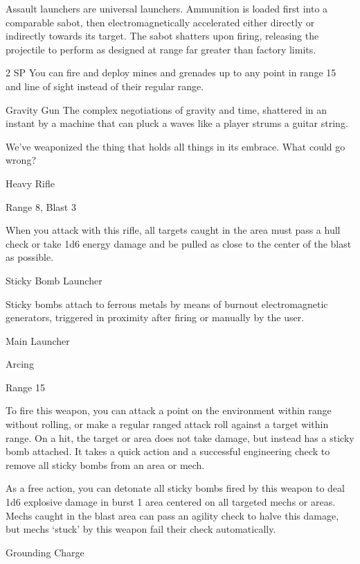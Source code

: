 Assault launchers are universal launchers. Ammunition is loaded first into a comparable sabot, then  
electromagnetically accelerated either directly or indirectly towards its target. The sabot shatters upon  
firing, releasing the projectile to perform as designed at range far greater than factory limits.   

2 SP  
You can fire and deploy mines and grenades up to any point in range 15 and line of sight instead  
of their regular range. 
 

                                                                                                               


Gravity Gun  
The complex negotiations of gravity and time, shattered in an instant by a machine that can pluck  
a waves like a player strums a guitar string.   

We’ve weaponized the thing that holds all things in its embrace. What could go wrong?  

Heavy Rifle
 
Range 8, Blast 3
 
When you attack with this rifle, all targets caught in the area must pass a hull check or take 1d6  
energy damage and be pulled as close to the center of the blast as possible.
 

Sticky Bomb Launcher  

Sticky bombs attach to ferrous metals by means of burnout electromagnetic generators, triggered in  
proximity after firing or manually by the user.   

Main Launcher
 
Arcing
 
Range 15
 
To fire this weapon, you can attack a point on the environment within range without rolling, or  
make a regular ranged attack roll against a target within range. On a hit, the target or area does  
not take damage, but instead has a sticky bomb attached. It takes a quick action and a  
successful engineering check to remove all sticky bombs from an area or mech.
 
As a free action, you can detonate all sticky bombs fired by this weapon to deal 1d6 explosive  
damage in burst 1 area centered on all targeted mechs or areas. Mechs caught in the blast area  
can pass an agility check to halve this damage, but mechs ‘stuck’ by this weapon fail their check  
automatically.
 

Grounding Charge  

